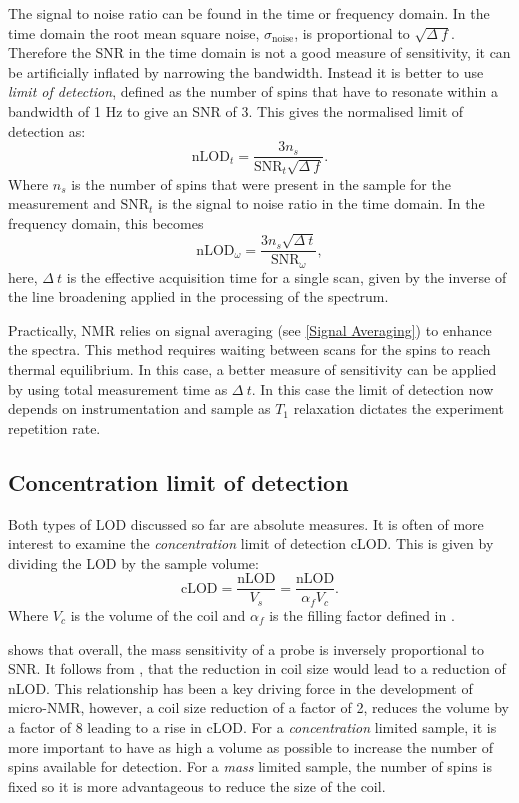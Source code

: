 The signal to noise ratio can be found in the time or frequency domain. In the time domain the root mean square noise, $\sigma_\text{noise}$,
is proportional to $\sqrt{\Delta~f}$. Therefore the SNR in the time domain is not a good measure of sensitivity, it can be
artificially inflated by narrowing the bandwidth. Instead it is better to use \textit{limit of detection}, defined as
the number of spins that have to resonate within a bandwidth of 1 Hz to give an SNR of 3. This gives
the normalised limit of detection as\citep{Badilita:2011td}:
\begin{equation}
  \text{nLOD}_{t} = \frac{3n_s}{\text{SNR}_{t}\sqrt{\Delta~f}}.
\end{equation}
Where $n_s$ is the number of spins that were present in the sample for the measurement and $\text{SNR}_t$ is the
signal to noise ratio in the time domain.
In the frequency domain, this becomes
\begin{equation}\label{eqn:nLOD}
  \text{nLOD}_\omega = \frac{3n_s\sqrt{\Delta~t}}{\text{SNR}_\omega},
\end{equation}
here, $\Delta~t$ is the effective acquisition time for a single scan, given by the inverse of the
line broadening applied in the processing of the spectrum.

Practically, NMR relies on signal averaging (see \ref{Signal Averaging}) to enhance the spectra. This
method requires waiting between scans for the spins to reach thermal equilibrium. In
this case, a better measure of sensitivity can be applied by using total measurement time
as $\Delta~t$. In this case the limit of detection now depends on instrumentation
and sample as $T_1$ relaxation dictates the experiment repetition rate.

\subsection{Concentration limit of detection}

Both types of LOD discussed so far are absolute measures. It is often of more
interest to examine the \textit{concentration} limit of detection cLOD. This is given by
dividing the LOD by the sample volume:
\begin{equation}\label{eqn:cLOD}
  \text{cLOD} = \frac{\text{nLOD}}{V_s} =\frac{\text{nLOD}}{\alpha_fV_c}.
\end{equation}
Where $V_c$ is the volume of the coil and $\alpha_f$ is the filling factor defined in .

 shows that overall, the mass sensitivity of a probe is inversely proportional
to SNR. It follows from , that the reduction in coil size would lead to a reduction of
nLOD. This relationship has been a key driving force in the development of micro-NMR, however,
a coil size reduction of a factor of 2, reduces the volume by a factor of 8 leading to a
rise in cLOD. For a \textit{concentration} limited sample, it is more important to have
as high a volume as possible to increase the number of spins available for detection. For a \textit{mass} limited
sample, the number of spins is fixed so it is more advantageous to reduce the size of the coil.


